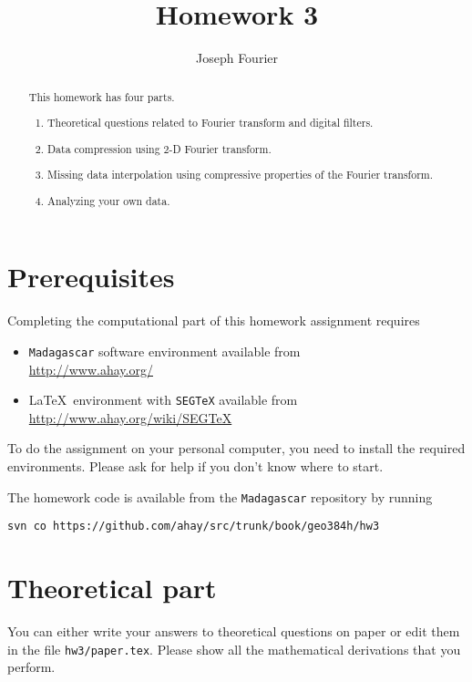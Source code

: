 \author{Joseph Fourier}
\title{Homework 3}

\begin{abstract}
  This homework has four parts. 
  \begin{enumerate}
  \item Theoretical questions related to Fourier transform and digital filters.
  \item Data compression using 2-D Fourier transform.
  \item Missing data interpolation using compressive properties of the Fourier transform.
  \item Analyzing your own data.
  \end{enumerate}
\end{abstract}

\section{Prerequisites}

Completing the computational part of this homework assignment requires
\begin{itemize}
\item \texttt{Madagascar} software environment available from \\
\url{http://www.ahay.org/}
\item \LaTeX\ environment with \texttt{SEGTeX} available from \\ 
\url{http://www.ahay.org/wiki/SEGTeX}
\end{itemize}
To do the assignment on your personal computer, you need to install
the required environments. Please ask for help if you don't know where
to start.

The homework code is available from the \texttt{Madagascar} repository
by running
\begin{verbatim}
svn co https://github.com/ahay/src/trunk/book/geo384h/hw3
\end{verbatim}

\section{Theoretical part}

You can either write your answers to theoretical questions on paper or
edit them in the file \texttt{hw3/paper.tex}. Please show all the
mathematical derivations that you perform.


